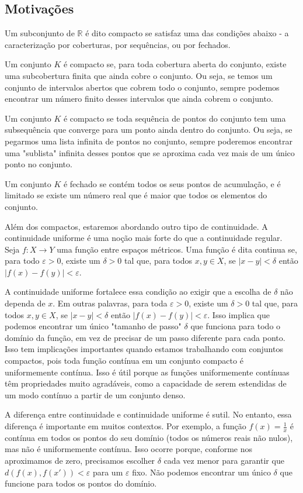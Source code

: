 \documentclass{article}
\begin{document}
\subsection{Motivações}
Um subconjunto de $\mathbb{R}$ é dito compacto se satisfaz uma das condições abaixo - a caracterização por coberturas, por sequências, ou
por fechados.

Um conjunto $K$ é compacto se, para toda cobertura aberta do conjunto, existe uma subcobertura finita que ainda cobre o conjunto.
Ou seja, se temos um conjunto de intervalos abertos que cobrem todo o conjunto, sempre podemos encontrar um número finito desses intervalos
que ainda cobrem o conjunto.

Um conjunto $K$ é compacto se toda sequência de pontos do conjunto tem uma subsequência que converge para um ponto ainda dentro
do conjunto. Ou seja, se pegarmos uma lista infinita de pontos no conjunto, sempre poderemos encontrar uma "sublista" infinita 
desses pontos que se aproxima cada vez mais de um único ponto no conjunto.

Um conjunto $K$ é fechado se contém todos os seus pontos de acumulação, e é limitado se existe um número real que é maior que todos os elementos do conjunto.

Além dos compactos, estaremos abordando outro tipo de continuidade. A continuidade uniforme é uma noção mais forte do que a continuidade regular. Seja $f: X \rightarrow Y$ uma função entre espaços métricos. Uma função é dita continua se, para todo $\varepsilon > 0$, existe um $\delta > 0$ tal que, para todos $x, y \in X$, se $|x - y| < \delta$ então $|f(x) - f(y)| < \varepsilon$.

A continuidade uniforme fortalece essa condição ao exigir que a escolha de $\delta$ não dependa de $x$. Em outras palavras,
para toda $\varepsilon > 0$, existe um $\delta > 0$ tal que, para todos $x, y \in X$, se $|x - y| < \delta$ então 
$|f(x) - f(y)| < \varepsilon$. Isso implica que podemos encontrar um único "tamanho de passo" $\delta$ que funciona para todo
o domínio da função, em vez de precisar de um passo diferente para cada ponto.
Isso tem implicações importantes quando estamos trabalhando com conjuntos compactos, pois toda função contínua em um
conjunto compacto é uniformemente contínua. Isso é útil porque as funções uniformemente contínuas têm propriedades muito agradáveis,
como a capacidade de serem estendidas de um modo contínuo a partir de um conjunto denso.

A diferença entre continuidade e continuidade uniforme é sutil. No entanto, essa diferença é importante em muitos contextos. 
Por exemplo, a função $f(x) = \frac{1}{x}$ é contínua em todos os pontos do seu domínio (todos os números reais não nulos), 
mas não é uniformemente contínua. Isso ocorre porque, conforme nos aproximamos de zero, precisamos escolher $\delta$ cada vez
menor para garantir que $d(f(x), f(x')) < \varepsilon$ para um $\varepsilon$ fixo. Não podemos encontrar um único $\delta$ que
funcione para todos os pontos do domínio.
\end{document}
